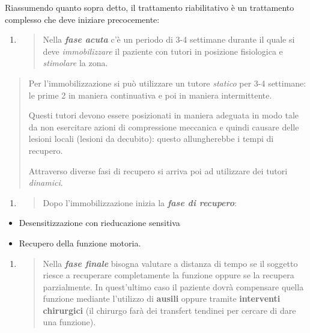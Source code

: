 \documentclass[]{article}
\begin{document}
Riassumendo quanto sopra detto, il trattamento riabilitativo è un
trattamento complesso che deve iniziare precocemente:

\begin{enumerate}
\def\labelenumi{\arabic{enumi}.}
\item
  \begin{quote}
  Nella \textbf{\emph{fase acuta}} c'è un periodo di 3-4 settimane
  durante il quale si deve \emph{immobilizzare} il paziente con tutori
  in posizione fisiologica e \emph{stimolare} la zona.
  \end{quote}
\end{enumerate}

\begin{quote}
Per l'immobilizzazione si può utilizzare un tutore \emph{statico} per
3-4 settimane: le prime 2 in maniera continuativa e poi in maniera
intermittente.

Questi tutori devono essere posizionati in maniera adeguata in modo tale
da non esercitare azioni di compressione meccanica e quindi causare
delle lesioni locali (lesioni da decubito): questo allungherebbe i tempi
di recupero.

Attraverso diverse fasi di recupero si arriva poi ad utilizzare dei
tutori \emph{dinamici}.
\end{quote}

\begin{enumerate}
\def\labelenumi{\arabic{enumi}.}
\item
  \begin{quote}
  Dopo l'immobilizzazione inizia la \textbf{\emph{fase di recupero}}:
  \end{quote}
\end{enumerate}

\begin{itemize}
\item
  Desensitizzazione con rieducazione sensitiva
\item
  Recupero della funzione motoria.
\end{itemize}

\begin{enumerate}
\def\labelenumi{\arabic{enumi}.}
\item
  \begin{quote}
  Nella \textbf{\emph{fase finale}} bisogna valutare a distanza di tempo
  se il soggetto riesce a recuperare completamente la funzione oppure se
  la recupera parzialmente. In quest'ultimo caso il paziente dovrà
  compensare quella funzione mediante l'utilizzo di \textbf{ausili}
  oppure tramite \textbf{interventi chirurgici} (il chirurgo farà dei
  transfert tendinei per cercare di dare una funzione).
  \end{quote}
\end{enumerate}
\end{document}
